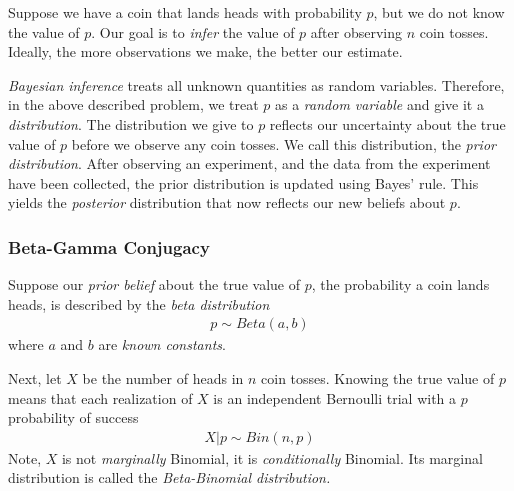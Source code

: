 \documentclass[11pt,a4paper]{article}
\begin{document}
Suppose we have a coin that lands heads with probability \(p\), 
but we do not know the value of \(p\). 
Our goal is to \emph{infer} the value of \(p\) after observing \(n\) coin tosses. 
Ideally, 
the more observations we make, 
the better our estimate.

\emph{Bayesian inference} treats all unknown quantities as random variables. 
Therefore, 
in the above described problem, 
we treat \(p\) as a \emph{random variable} and give it a \emph{distribution}. 
The distribution we give to \(p\) reflects our uncertainty about the 
true value of \(p\) before we observe any coin tosses. 
We call this distribution, 
the \emph{prior distribution}. 
After observing an experiment, 
and the data from the experiment have been collected, 
the prior distribution is updated using Bayes' rule. 
This yields the \emph{posterior} distribution that now reflects 
our new beliefs about \(p\).

\subsubsection{Beta-Gamma Conjugacy}

Suppose our \emph{prior belief} about the true value of \(p\), 
the probability a coin lands heads, 
is described by the \emph{beta distribution}
\begin{align}
p \sim Beta(a,b)
\end{align}
where \(a\) and \(b\) are \emph{known constants}.

Next, 
let \(X\) be the number of heads in \(n\) coin tosses. 
Knowing the true value of \(p\) means that each realization of \(X\) is an 
independent Bernoulli trial with a \(p\) probability of success
\begin{align}
X|p \sim Bin(n,p)
\end{align}
Note, 
\(X\) is not \emph{marginally} Binomial, 
it is \emph{conditionally} Binomial. 
Its marginal distribution is called the \emph{Beta-Binomial distribution.}
\end{document}
